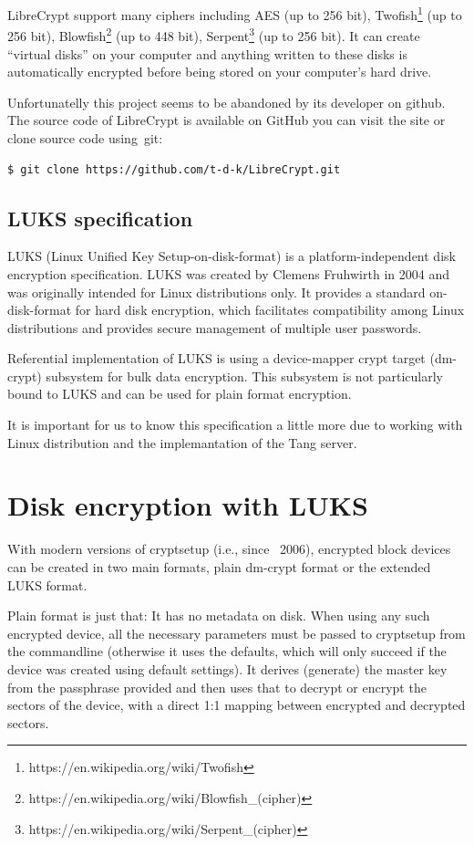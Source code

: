 LibreCrypt support many ciphers including AES (up to 256 bit), Twofish\footnote{https://en.wikipedia.org/wiki/Twofish} (up to 256 bit), Blowfish\footnote{https://en.wikipedia.org/wiki/Blowfish\_(cipher)} (up to 448 bit), Serpent\footnote{https://en.wikipedia.org/wiki/Serpent\_(cipher)} (up to 256 bit)\cite{librecrypt}.
It can create “virtual disks” on your computer and anything written to these disks is automatically encrypted before being stored on your computer’s hard drive\cite{FreeOTFE}.

Unfortunatelly this project seems to be abandoned by its developer on github.
The source code of LibreCrypt is available on GitHub you can visit the site or clone source code using~git:

{\tt \$ git clone https://github.com/t-d-k/LibreCrypt.git}

\subsection{LUKS specification}

LUKS (Linux Unified Key Setup-on-disk-format) is a platform-independent disk encryption specification.
LUKS was created by Clemens Fruhwirth in 2004 and was originally intended for Linux distributions only.
It provides a standard on-disk-format for hard disk encryption, which facilitates compatibility among Linux distributions and provides secure management of multiple user passwords.

Referential implementation of LUKS is using a device-mapper crypt target (dm-crypt) subsystem for bulk data encryption.
This subsystem is not particularly bound to LUKS and can be used for plain format encryption.

It is important for us to know this specification a little more due to working with Linux distribution and the implemantation of the Tang server.

\section{Disk encryption with LUKS}

With modern versions of cryptsetup (i.e., since ~2006), encrypted block devices can be created in two main formats, plain dm-crypt format or the extended LUKS format.

Plain format is just that: It has no metadata on disk.
When using any such encrypted device, all the necessary parameters must be passed to cryptsetup from the commandline (otherwise it uses the defaults, which will only succeed if the device was created using default settings).
It derives (generate) the master key from the passphrase provided and then uses that to decrypt or encrypt the sectors of the device, with a direct 1:1 mapping between encrypted and decrypted sectors.


